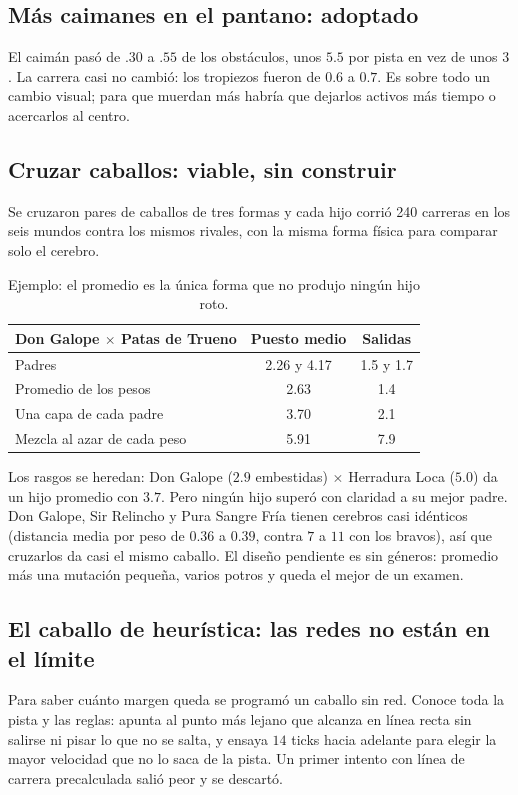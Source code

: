 \documentclass[11pt,letterpaper]{article}
\begin{document}
\subsection{Más caimanes en el pantano: adoptado}
El caimán pasó de $.30$ a $.55$ de los obstáculos, unos $5.5$ por pista en vez de unos $3$. La carrera casi no cambió: los tropiezos fueron de $0.6$ a $0.7$. Es sobre todo un cambio visual; para que muerdan más habría que dejarlos activos más tiempo o acercarlos al centro.

\subsection{Cruzar caballos: viable, sin construir}
Se cruzaron pares de caballos de tres formas y cada hijo corrió 240 carreras en los seis mundos contra los mismos rivales, con la misma forma física para comparar solo el cerebro.

\begin{table}[h]\centering
\begin{tabular}{lcc}
\toprule
Don Galope $\times$ Patas de Trueno & Puesto medio & Salidas \\
\midrule
Padres & 2.26 y 4.17 & 1.5 y 1.7 \\
Promedio de los pesos & 2.63 & 1.4 \\
Una capa de cada padre & 3.70 & 2.1 \\
Mezcla al azar de cada peso & 5.91 & 7.9 \\
\bottomrule
\end{tabular}
\caption{Ejemplo: el promedio es la única forma que no produjo ningún hijo roto.}
\end{table}

Los rasgos se heredan: Don Galope ($2.9$ embestidas) $\times$ Herradura Loca ($5.0$) da un hijo promedio con $3.7$. Pero ningún hijo superó con claridad a su mejor padre. Don Galope, Sir Relincho y Pura Sangre Fría tienen cerebros casi idénticos (distancia media por peso de $0.36$ a $0.39$, contra $7$ a $11$ con los bravos), así que cruzarlos da casi el mismo caballo. El diseño pendiente es sin géneros: promedio más una mutación pequeña, varios potros y queda el mejor de un examen.

\subsection{El caballo de heurística: las redes no están en el límite}
Para saber cuánto margen queda se programó un caballo sin red. Conoce toda la pista y las reglas: apunta al punto más lejano que alcanza en línea recta sin salirse ni pisar lo que no se salta, y ensaya $14$ ticks hacia adelante para elegir la mayor velocidad que no lo saca de la pista. Un primer intento con línea de carrera precalculada salió peor y se descartó.
\end{document}
